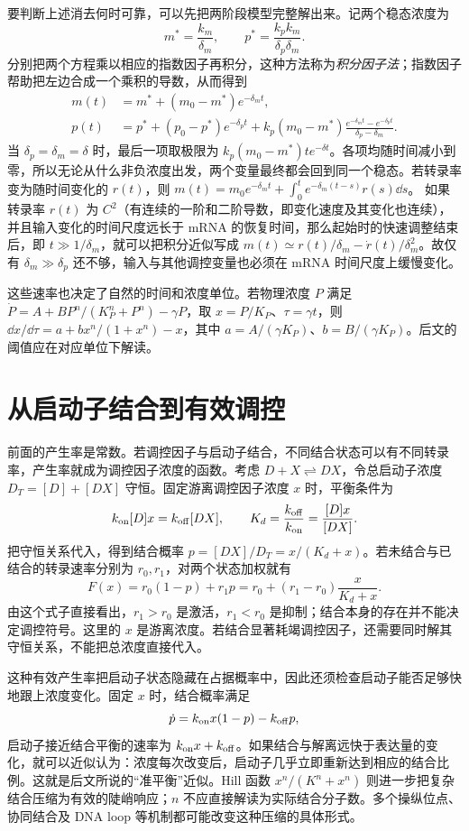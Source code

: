 要判断上述消去何时可靠，可以先把两阶段模型完整解出来。记两个稳态浓度为
\[
m^*=\frac{k_m}{\delta_m},\qquad p^*=\frac{k_pk_m}{\delta_p\delta_m}.
\]
分别把两个方程乘以相应的指数因子再积分，这种方法称为\emph{积分因子法}；指数因子帮助把左边合成一个乘积的导数，从而得到
\begin{align}
m(t)&=m^*+(m_0-m^*)e^{-\delta_mt},\\
p(t)&=p^*+(p_0-p^*)e^{-\delta_pt}
 +k_p(m_0-m^*)\frac{e^{-\delta_mt}-e^{-\delta_pt}}{\delta_p-\delta_m}.
\end{align}
当 $\delta_p=\delta_m=\delta$ 时，最后一项取极限为 $k_p(m_0-m^*)te^{-\delta t}$。各项均随时间减小到零，所以无论从什么非负浓度出发，两个变量最终都会回到同一个稳态。若转录率变为随时间变化的 $r(t)$，则
$m(t)=m_0e^{-\delta_mt}+\int_0^t e^{-\delta_m(t-s)}r(s)\dd s$。
如果转录率 $r(t)$ 为 $C^2$（有连续的一阶和二阶导数，即变化速度及其变化也连续），并且输入变化的时间尺度远长于 mRNA 的恢复时间，那么起始时的快速调整结束后，即 $t\gg1/\delta_m$，就可以把积分近似写成
$m(t)\simeq r(t)/\delta_m-\dot r(t)/\delta_m^2$。故仅有 $\delta_m\gg\delta_p$ 还不够，输入与其他调控变量也必须在 mRNA 时间尺度上缓慢变化。

这些速率也决定了自然的时间和浓度单位。若物理浓度 $P$ 满足 $\dot P=A+B P^n/(K_P^n+P^n)-\gamma P$，取 $x=P/K_P$、$\tau=\gamma t$，则
$\dd x/\dd\tau=a+b x^n/(1+x^n)-x$，其中 $a=A/(\gamma K_P)$、$b=B/(\gamma K_P)$。后文的阈值应在对应单位下解读。

\section{从启动子结合到有效调控}
前面的产生率是常数。若调控因子与启动子结合，不同结合状态可以有不同转录率，产生率就成为调控因子浓度的函数。考虑 $D+X\rightleftharpoons DX$，令总启动子浓度 $D_T=[D]+[DX]$ 守恒。固定游离调控因子浓度 $x$ 时，平衡条件为
\[
k_{\rm on}[D]x=k_{\rm off}[DX],\qquad K_d=\frac{k_{\rm off}}{k_{\rm on}}=\frac{[D]x}{[DX]}.
\]
把守恒关系代入，得到结合概率 $p=[DX]/D_T=x/(K_d+x)$。若未结合与已结合的转录速率分别为 $r_0,r_1$，对两个状态加权就有
\begin{equation}F(x)=r_0(1-p)+r_1p=r_0+(r_1-r_0)\frac{x}{K_d+x}.\label{eq:occupancy}\end{equation}
由这个式子直接看出，$r_1>r_0$ 是激活，$r_1<r_0$ 是抑制；结合本身的存在并不能决定调控符号。这里的 $x$ 是游离浓度。若结合显著耗竭调控因子，还需要同时解其守恒关系，不能把总浓度直接代入。

这种有效产生率把启动子状态隐藏在占据概率中，因此还须检查启动子能否足够快地跟上浓度变化。固定 $x$ 时，结合概率满足
\[
\dot p=k_{\rm on}x(1-p)-k_{\rm off}p,
\]
启动子接近结合平衡的速率为 $k_{\rm on}x+k_{\rm off}$。如果结合与解离远快于表达量的变化，就可以近似认为：浓度每次改变后，启动子几乎立即重新达到相应的结合比例。这就是后文所说的“准平衡”近似。Hill 函数 $x^n/(K^n+x^n)$ 则进一步把复杂结合压缩为有效的陡峭响应；$n$ 不应直接解读为实际结合分子数。多个操纵位点、协同结合及 DNA loop 等机制都可能改变这种压缩的具体形式。


